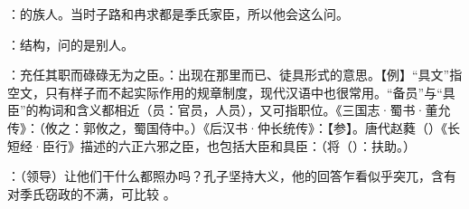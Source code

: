 {
\item {}：的族人。当时子路和冉求都是季氏家臣，所以他会这么问。
\item {}：结构，问的是别人。
\item {}：充任其职而碌碌无为之臣。：出现在那里而已、徒具形式的意思。【例】“具文”指空文，只有样子而不起实际作用的规章制度，现代汉语中也很常用。“备员”与“具臣”的构词和含义都相近（员：官员，人员），又可指职位。《三国志·蜀书·董允传》：（攸之：郭攸之，蜀国侍中。）《后汉书·仲长统传》：【参】。唐代赵蕤（）《长短经·臣行》描述的六正六邪之臣，也包括大臣和具臣：（将（）：扶助。）
\item {}：（领导）让他们干什么都照办吗？孔子坚持大义，他的回答乍看似乎突兀，含有对季氏窃政的不满，可比较 。
}
{}


